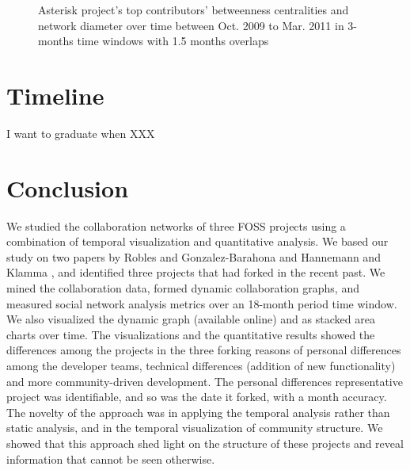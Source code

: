 \documentclass[conference]{IEEEtran}
\begin{document}
\begin{figure}[!Htbp]
\centering
{}
\justifying
{}
\caption{Asterisk project's top contributors' betweenness centralities and network diameter over time between Oct. 2009 to Mar. 2011 in 3-months time windows with 1.5 months overlaps}
\label{figureAsteriskStackedAreaChart}
\end{figure}


\section{Timeline}

I want to graduate when XXX

\section{Conclusion}
We studied the collaboration networks of three FOSS projects using a combination of temporal visualization and quantitative analysis. We based our study on two papers by Robles and Gonzalez-Barahona \cite{Robles} and Hannemann and Klamma \cite{Hannemann}, and identified three projects that had forked in the recent past. We mined the collaboration data, formed dynamic collaboration graphs, and measured social network analysis metrics over an 18-month period time window. \\

We also visualized the dynamic graph (available online) and as stacked area charts over time. The visualizations and the quantitative results showed the differences among the projects in the three forking reasons of personal differences among the developer teams, technical differences (addition of new functionality) and more community-driven development. The personal differences representative project was identifiable, and so was the date it forked, with a month accuracy. The novelty of the approach was in applying the temporal analysis rather than static analysis, and in the temporal visualization of community structure. We showed that this approach shed light on the structure of these projects and reveal information that cannot be seen otherwise. \\

\end{document}
